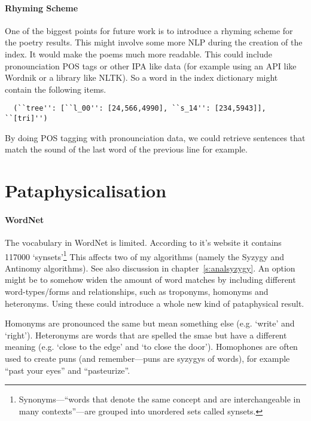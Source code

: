 \paragraph{Rhyming Scheme} 
One of the biggest points for future work is to introduce a rhyming scheme for the poetry results. This might involve some more \ac{NLP} during the creation of the index. It would make the poems much more readable. This could include pronounciation \ac{POS} tags or other \ac{IPA} like data (for example using an \ac{API} like Wordnik \autocite{Wordnik2016} or a library like \ac{NLTK}). So a word in the index dictionary might contain the following items.

\begin{verbatim}
  (``tree'': [``l_00'': [24,566,4990], ``s_14'': [234,5943]], ``[tri]'')
\end{verbatim}

By doing \ac{POS} tagging with pronounciation data, we could retrieve sentences that match the sound of the last word of the previous line for example.


\section{Pataphysicalisation}

\paragraph{WordNet}
The vocabulary in WordNet is limited. According to it's website \autocite{Princeton2010} it contains \num{117000} `synsets'\footnote{Synonyms---``words that denote the same concept and are interchangeable in many contexts''---are grouped into unordered sets called synsets.} This affects two of my algorithms (namely the Syzygy and Antinomy algorithms). See also discussion in chapter~\ref{s:analsyzygy}. An option might be to somehow widen the amount of word matches by including different word-types/forms and relationships, such as troponyms, homonyms and heteronyms. Using these could introduce a whole new kind of pataphysical result. 

Homonyms are pronounced the same but mean something else (e.g. `write' and `right'). Heteronyms are words that are spelled the smae but have a different meaning (e.g. `close to the edge' and `to close the door'). Homophones are often used to create puns (and remember---puns are syzygys of words), for example ``past your eyes'' and ``pasteurize''. 

